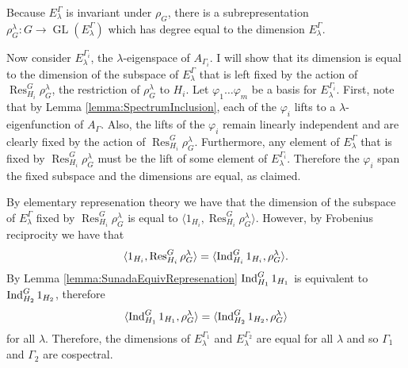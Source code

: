 Because $E_{\lambda}^{\Gamma}$ is invariant under $\rho_G$, there is a subrepresentation $\rho_G^\lambda : G \to \operatorname{GL}(E_{\lambda}^{\Gamma})$ which has degree equal to the dimension $E_{\lambda}^{\Gamma}$. 

Now consider $E_{\lambda}^{\Gamma_i}$, the $\lambda$-eigenspace of $A_{\Gamma_i}$. I will show that its dimension is equal to the dimension of the subspace of $E_{\lambda}^{\Gamma}$ that is left fixed by the action of $\operatorname{Res}_{H_i}^G \rho_G^\lambda$, the restriction of $\rho_G^\lambda$ to $H_i$. Let $\varphi_1 \ldots \varphi_m$ be a basis for $E_{\lambda}^{\Gamma_i}$. First, note that by Lemma \ref{lemma:SpectrumInclusion}, each of the $\varphi_i$ lifts to a $\lambda$-eigenfunction of $A_\Gamma$. Also, the lifts of the $\varphi_i$ remain linearly independent and are clearly fixed by the action of $\operatorname{Res}_{H_i}^G \rho_G^\lambda$. Furthermore, any element of $E_{\lambda}^{\Gamma}$ that is fixed by $\operatorname{Res}_{H_i}^G \rho_G^\lambda$ must be the lift of some element of $E_{\lambda}^{\Gamma_i}$. Therefore the $\varphi_i$ span the fixed subspace and the dimensions are equal, as claimed.

By elementary represenation theory we have that the dimension of the subspace of $E_{\lambda}^{\Gamma}$ fixed by $\operatorname{Res}_{H_i}^G \rho_G^\lambda$ is equal to $\langle 1_{H_i}, \operatorname{Res}_{H_i}^G \rho_G^\lambda \rangle$. However, by Frobenius reciprocity we have that 
$$
    \langle 1_{H_i}, \operatorname{Res}_{H_i}^G \rho_G^\lambda \rangle = \langle \operatorname{Ind}_{H_i}^G 1_{H_i}, \rho_G^\lambda \rangle.
$$
By Lemma \ref{lemma:SunadaEquivRepresenation} $\operatorname{Ind}_{H_1}^G 1_{H_1}$ is equivalent to $\operatorname{Ind}_{H_2}^G 1_{H_2}$, therefore
$$
    \langle \operatorname{Ind}_{H_1}^G 1_{H_1}, \rho_G^\lambda \rangle = \langle \operatorname{Ind}_{H_2}^G 1_{H_2}, \rho_G^\lambda \rangle
$$
for all $\lambda$. Therefore, the dimensions of $E_{\lambda}^{\Gamma_1}$ and $E_{\lambda}^{\Gamma_2}$ are equal for all $\lambda$ and so $\Gamma_1$ and $\Gamma_2$ are cospectral.
